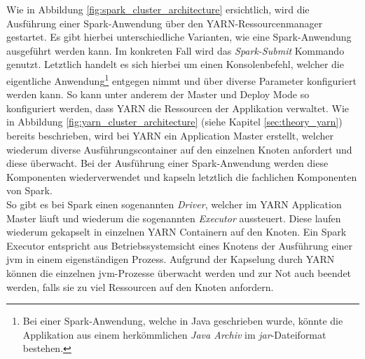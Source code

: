 \noindent
Wie in Abbildung \ref{fig:spark_cluster_architecture} ersichtlich, wird die Ausführung einer Spark-Anwendung über den YARN-Ressourcenmanager gestartet. Es gibt hierbei unterschiedliche Varianten, wie eine Spark-Anwendung ausgeführt werden kann. 
Im konkreten Fall wird das \textit{Spark-Submit} Kommando genutzt. Letztlich handelt es sich hierbei um einen Konsolenbefehl, welcher die eigentliche Anwendung\footnote{Bei einer Spark-Anwendung, welche in Java geschrieben wurde, könnte die Applikation aus einem herkömmlichen \textit{Java Archiv} im \textit{\gls{jar}}-Dateiformat bestehen.} entgegen nimmt und über diverse Parameter konfiguriert werden kann. 
So kann unter anderem der Master und Deploy Mode so konfiguriert werden, dass YARN die Ressourcen der Applikation verwaltet. Wie in Abbildung \ref{fig:yarn_cluster_architecture} (siehe Kapitel \ref{sec:theory_yarn}) bereits beschrieben, wird bei YARN ein Application Master erstellt, welcher wiederum diverse Ausführungscontainer auf den einzelnen Knoten anfordert und diese überwacht. Bei der Ausführung einer Spark-Anwendung werden diese Komponenten wiederverwendet und kapseln letztlich die fachlichen Komponenten von Spark.\\
So gibt es bei Spark einen sogenannten \textit{Driver}, welcher im YARN Application Master läuft und wiederum die sogenannten \textit{Executor} aussteuert. Diese laufen wiederum gekapselt in einzelnen YARN Containern auf den Knoten. Ein Spark Executor entspricht aus Betriebssystemsicht eines Knotens der Ausführung einer \gls{jvm} in einem eigenständigen Prozess. Aufgrund der Kapselung durch YARN können die einzelnen \gls{jvm}-Prozesse überwacht werden und zur Not auch beendet werden, falls sie zu viel Ressourcen auf den Knoten anfordern.\\

